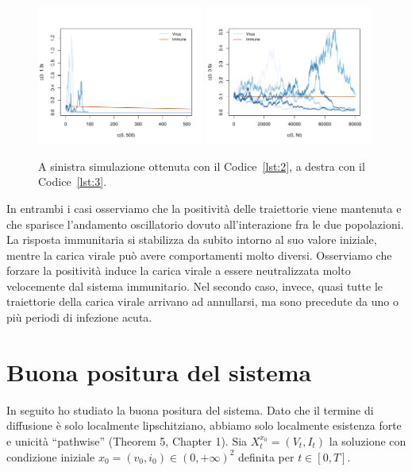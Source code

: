 \documentclass[12pt,a4paper,oneside]{article}
\theoremstyle{definition}
\begin{document}
\begin{figure}[ht]
\centering
\caption{A sinistra simulazione ottenuta con il Codice~\ref{lst:2}, a destra con il Codice~\ref{lst:3}.}\label{fig:2}
\includegraphics[width=0.49\textwidth]{inte_3}
\includegraphics[width=0.49\textwidth]{inte_2}
\end{figure}

In entrambi i casi osserviamo che la positività delle traiettorie viene mantenuta e che sparisce l'andamento oscillatorio dovuto all'interazione fra le due popolazioni. La risposta immunitaria si stabilizza da subito intorno al suo valore iniziale, mentre la carica virale può avere comportamenti molto diversi. Osserviamo che forzare la positività induce la carica virale a essere neutralizzata molto velocemente dal sistema immunitario. Nel secondo caso, invece, quasi tutte le traiettorie della carica virale arrivano ad annullarsi, ma sono precedute da uno o più periodi di infezione acuta. 

\section{Buona positura del sistema}
In seguito ho studiato la buona positura del sistema. Dato che il termine di diffusione è solo localmente lipschitziano, abbiamo solo localmente esistenza forte e unicità ``pathwise'' (Theorem 5, Chapter 1). Sia $X_t^{x_0}=(V_t,I_t)$ la soluzione con condizione iniziale $x_0=(v_0,i_0)\in (0,+\infty)^2$ definita per $t\in [0,T]$. 
\end{document}

